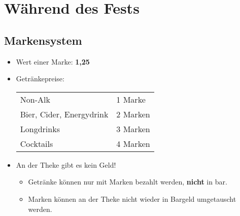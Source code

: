 \section{Während des Fests}
\subsection{Markensystem}
\begin{itemize}
  \item Wert einer Marke: \large{\textbf{1,25\EUR}}
  \item Getränkepreise:\\
    \begin{tabular}{ll}
      Non-Alk & 1 Marke \\
      Bier, Cider, Energydrink & 2 Marken \\
      Longdrinks & 3 Marken \\
      Cocktails & 4 Marken
    \end{tabular}
  \item An der Theke gibt es kein Geld!
    \begin{itemize}
      \item Getränke können nur mit Marken bezahlt werden, \textbf{nicht} in bar.
      \item Marken können an der Theke nicht wieder in Bargeld umgetauscht werden.
    \end{itemize}
\end{itemize}
